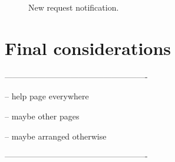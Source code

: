 \begin{figure}%
	\hfill%
	\hfill%
	\caption{New request notification.}\label{fig:notif}
\end{figure}



\clearpage


\section{Final considerations}

----------------------------------------------------

-- help page everywhere

-- maybe other pages

-- maybe arranged otherwise

----------------------------------------------------

\lipsum[1-2]














